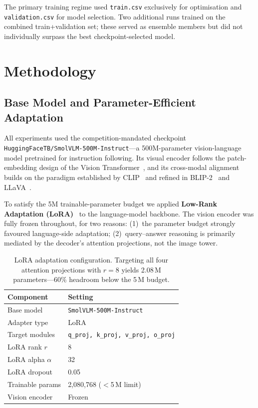 \documentclass[11pt,twocolumn]{article}
\begin{document}
The primary training regime used \texttt{train.csv} exclusively for optimisation and \texttt{validation.csv} for model selection. Two additional runs trained on the combined train+validation set; these served as ensemble members but did not individually surpass the best checkpoint-selected model.

\section{Methodology}
\label{sec:method}

\subsection{Base Model and Parameter-Efficient Adaptation}
\label{sec:lora}

All experiments used the competition-mandated checkpoint \texttt{HuggingFaceTB/SmolVLM-500M-Instruct}---a 500M-parameter vision-language model pretrained for instruction following. Its visual encoder follows the patch-embedding design of the Vision Transformer~\cite{dosovitskiy2021vit}, and its cross-modal alignment builds on the paradigm established by CLIP~\cite{radford2021clip} and refined in BLIP-2~\cite{li2023blip2} and LLaVA~\cite{liu2023llava}.

To satisfy the 5M trainable-parameter budget we applied \textbf{Low-Rank Adaptation (LoRA)}~\cite{hu2022lora} to the language-model backbone. The vision encoder was fully frozen throughout, for two reasons: (1)~the parameter budget strongly favoured language-side adaptation; (2)~query--answer reasoning is primarily mediated by the decoder's attention projections, not the image tower.

\begin{table}[h]
\centering
\small
\setlength{\tabcolsep}{3pt}
\begin{tabularx}{\columnwidth}{>{\raggedright\arraybackslash}p{} X}
\toprule
\textbf{Component} & \textbf{Setting}\\
\midrule
Base model          & \texttt{SmolVLM-500M-Instruct}\\
Adapter type        & LoRA\\
Target modules      & \texttt{q\_proj, k\_proj, v\_proj, o\_proj}\\
LoRA rank $r$       & 8\\
LoRA alpha $\alpha$ & 32\\
LoRA dropout        & 0.05\\
Trainable params    & 2,080,768 ($<$5\,M limit)\\
Vision encoder      & Frozen\\
\bottomrule
\end{tabularx}
\caption{LoRA adaptation configuration. Targeting all four attention projections with $r{=}8$ yields 2.08\,M parameters---60\% headroom below the 5\,M budget.}
\label{tab:model}
\end{table}
\end{document}
